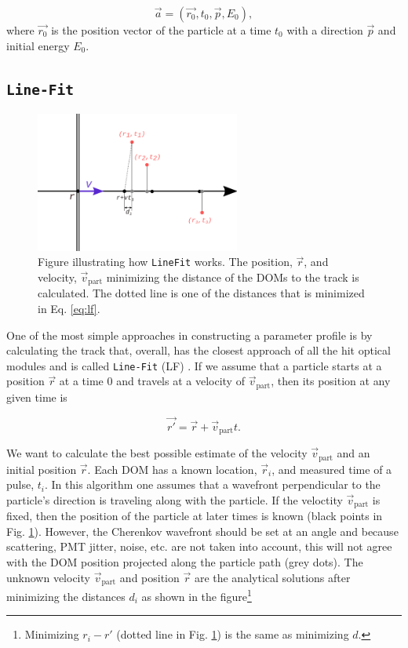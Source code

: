 \begin{equation}
\label{eq:vec}
\vec{a} = (\vec{r_0},t_0,\vec{p},E_0),
\end{equation}
\noindent where $\vec{r_0}$ is the position vector of the particle at a time $t_0$ with a direction $\vec{p}$ and initial energy $E_0$. 

\subsection{\texttt{Line-Fit}}
\label{subsec:lf}

\begin{figure}
\centering
\includegraphics[width=0.6\textwidth]{chapter7/img/linefit.png}
\caption{Figure illustrating how \texttt{LineFit} works. The position, $\vec{r}$, and velocity, $\vec{v}_\textrm{part}$ minimizing the distance of the DOMs to the track is calculated. The dotted line is one of the distances that is minimized in Eq. \ref{eq:lf}.}
\label{fig:lf}
\end{figure}

\noindent One of the most simple approaches in constructing a parameter profile is by calculating the track that, overall, has the closest approach of all the hit optical modules and is called \texttt{Line-Fit} (LF) \cite{Ahrens:2003fg}. If we assume that a particle starts at a position $\vec{r}$ at a time 0 and travels at a velocity of $\vec{v}_\textrm{part}$, then its position at any given time is

\begin{equation}
\vec{r'} = \vec{r} + \vec{v}_{\textrm{part}}t.
\end{equation}

\noindent We want to calculate the best possible estimate of the velocity $\vec{v}_\textrm{part}$ and an initial position $\vec{r}$. Each DOM has a known location, $\vec{r}_i$, and measured time of a pulse, $t_i$. In this algorithm one assumes that a wavefront perpendicular to the particle's direction is traveling along with the particle. If the veloctity $\vec{v}_\textrm{part}$ is fixed, then the position of the particle at later times is known (black points in Fig. \ref{fig:lf}). However, the Cherenkov wavefront should be set at an angle and because scattering, PMT jitter, noise, etc. are not taken into account, this will not agree with the DOM position projected along the particle path (grey dots). The unknown velocity $\vec{v}_\textrm{part}$ and position $\vec{r}$ are the analytical solutions after minimizing the distances $d_i$ as shown in the figure\footnote{Minimizing $r_i - r'$ (dotted line in Fig. \ref{fig:lf}) is the same as minimizing $d$.}

